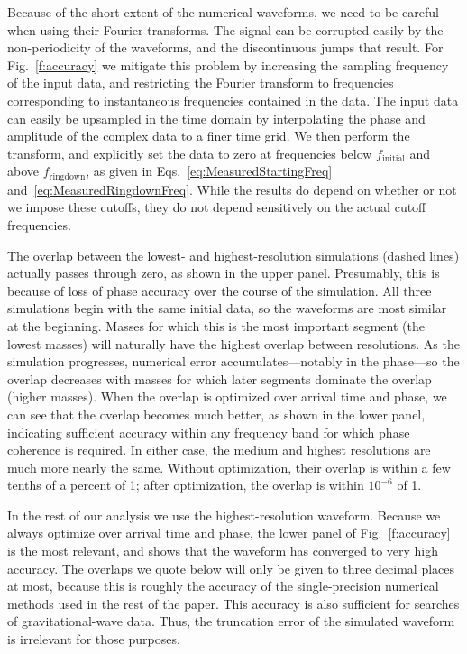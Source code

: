 Because of the short extent of the numerical waveforms, we need to be
careful when using their Fourier transforms.  The signal can be
corrupted easily by the non-periodicity of the waveforms, and the
discontinuous jumps that result.  For Fig.~\ref{f:accuracy} we
mitigate this problem by increasing the sampling frequency of the
input data, and restricting the Fourier transform to frequencies
corresponding to instantaneous frequencies contained in the data.  The
input data can easily be upsampled in the time domain by interpolating
the phase and amplitude of the complex data to a finer time grid.  We
then perform the transform, and explicitly set the data to zero at
frequencies below $f_{\mathrm{initial}}$ and above
$f_{\mathrm{ringdown}}$, as given in
Eqs.~\ref{eq:MeasuredStartingFreq} and~\ref{eq:MeasuredRingdownFreq}.
While the results do depend on whether or not we impose these cutoffs,
they do not depend sensitively on the actual cutoff frequencies.

The overlap between the lowest- and highest-resolution simulations
(dashed lines) actually passes through zero, as shown in the upper
panel.  Presumably, this is because of loss of phase accuracy over the
course of the simulation.  All three simulations begin with the same
initial data, so the waveforms are most similar at the beginning.
Masses for which this is the most important segment (the lowest
masses) will naturally have the highest overlap between resolutions.
As the simulation progresses, numerical error accumulates---notably in
the phase---so the overlap decreases with masses for which later
segments dominate the overlap (higher masses).  When the overlap is
optimized over arrival time and phase, we can see that the overlap
becomes much better, as shown in the lower panel, indicating
sufficient accuracy within any frequency band for which phase
coherence is required.  In either case, the medium and
highest resolutions are much more nearly the same.  Without
optimization, their overlap is within a few tenths of a percent of 1;
after optimization, the overlap is within $10^{-6}$ of 1.

In the rest of our analysis we use the highest-resolution waveform.
Because we always optimize over arrival time and phase, the lower
panel of Fig.~\ref{f:accuracy} is the most relevant, and shows that
the waveform has converged to very high accuracy.  The overlaps we
quote below will only be given to three decimal places at most,
because this is roughly the accuracy of the single-precision numerical
methods used in the rest of the paper.  This accuracy is also
sufficient for searches of gravitational-wave data.  Thus, the
truncation error of the simulated waveform is irrelevant for those
purposes.

